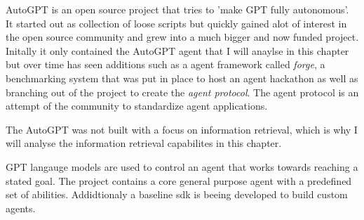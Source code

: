 \documentclass[../../main.tex]{subfiles}
\begin{document}
AutoGPT is an open source project that tries to 'make GPT fully autonomous'. It started out as collection of loose scripts but quickly gained alot of interest in the open source community and grew into a much bigger and now funded project. Initally it only contained the AutoGPT agent that I will anaylse in this chapter but over time has seen additions such as a agent framework called \textit{forge}, a benchmarking system that was put in place to host an agent hackathon as well as branching out of the project to create the \textit{agent protocol}. The agent protocol is an attempt of the community to standardize agent applications.

The AutoGPT was not built with a focus on information retrieval, which is why I will analyse the information retrieval capabilites in this chapter.

GPT langauge models are used to control an agent that works towards reaching a stated goal. The project contains a core general purpose agent with a predefined set of abilities. Addidtionaly a baseline sdk is beeing developed to build custom agents.
\end{document}
